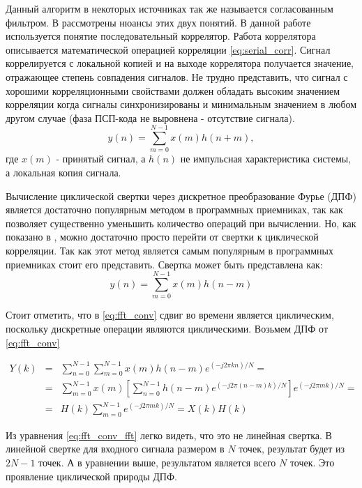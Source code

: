 Данный алгоритм в некоторых источниках так же называется согласованным фильтром. В \cite{sklyar} рассмотрены нюансы этих двух понятий.
В данной работе используется понятие последовательный коррелятор. Работа коррелятора описывается математической операцией
корреляции \ref{eq:serial_corr}. Сигнал коррелируется с локальной копией и на выходе коррелятора получается значение, отражающее
степень совпадения сигналов. Не трудно представить, что сигнал с хорошими корреляционными свойствами должен обладать высоким значением
корреляции когда сигналы синхронизированы и минимальным значением в любом другом случае (фаза ПСП-кода не выровнена - отсутствие сигнала).
\begin{equation}
	\label{eq:serial_corr}
	y(n)=\sum\limits_{m=0}^{N-1}{x(m)h(n+m)},
\end{equation}
где ${x(m)}$ - принятый сигнал, а ${h(n)}$ не импульсная характеристика системы, а локальная копия сигнала.


Вычисление циклической свертки через дискретное преобразование Фурье (ДПФ) является достаточно популярным методом
в программных приемниках, так как позволяет существенно уменьшить количество операций при вычислении. Но, как показано
в \cite{tsui, oppenheim}, можно достаточно просто перейти от свертки к циклической корреляции. Так как этот метод является самым
популярным в программных приемниках стоит его представить.
Свертка может быть представлена как:
\begin{equation}
	\label{eq:fft_conv}
	y(n)=\sum\limits_{m=0}^{N-1}{x(m)h(n-m)}
\end{equation}

Стоит отметить, что в \ref{eq:fft_conv} сдвиг во времени является циклическим, поскольку дискретные операции являются циклическими.
Возьмем ДПФ от \ref{eq:fft_conv}
\begin{center}
\begin{eqnarray}
	\label{eq:fft_conv_fft}
	Y(k) & = & \sum\limits_{n=0}^{N-1}\sum\limits_{m=0}^{N-1}{x(m)h(n-m)e^{(-j2\pi{kn})/N}}=\nonumber \\
	& = & \sum\limits_{m=0}^{N-1}{x(m)}[\sum\limits_{n=0}^{N-1}h(n-m)e^{(-j2\pi{(n-m)}k)/N}]e^{(-j2\pi{m}k)/N}=\\
	& = & H(k)\sum\limits_{m=0}^{N-1}e^{(-j2\pi{m}k)/N} = X(k)H(k)\nonumber 
\end{eqnarray}
\end{center}
Из уравнения \ref{eq:fft_conv_fft} легко видеть, что это не линейная свертка. В линейной свертке для входного сигнала размером в ${N}$ точек,
результат будет из ${2N-1}$ точек. А в уравнении выше, результатом является всего ${N}$ точек.
Это проявление циклической природы ДПФ.

